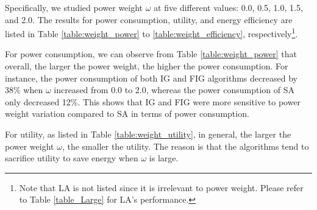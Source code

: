 \documentclass[conference]{IEEEtran}
\begin{document}
Specifically, we studied power weight $\omega$ at five different values: 0.0, 0.5, 1.0, 1.5, and 2.0. The results for power consumption, utility, and energy efficiency are listed in Table \ref{table:weight_power} to \ref{table:weight_efficiency}, respectively\footnote{Note that LA is not listed since it is irrelevant to power weight. Please refer to Table \ref{table_Large} for LA's performance.}. 

For power consumption, we can observe from Table \ref{table:weight_power} that overall, the larger the power weight, the higher the power consumption. For instance, the power consumption of both IG and FIG algorithms decreased by 38\% when $\omega$ increased from 0.0 to 2.0, whereas the power consumption of SA only decreased 12\%. This shows that IG and FIG were more sensitive to power weight variation compared to SA in terms of power consumption. 

\begin{table}[!htbp] \renewcommand{\arraystretch}{1}
\small
\begin{center}
\caption{Power Consumption (/Watt) for Different Power Weights $\omega$} 
\centering 
{}
\label{table:weight_power} 
\end{center}
\end{table}


For utility, as listed in Table \ref{table:weight_utility}, in general, the larger the power weight $\omega$, the smaller the utility. The reason is that the algorithms tend to sacrifice utility to save energy when $\omega$ is large. 
\end{document}
